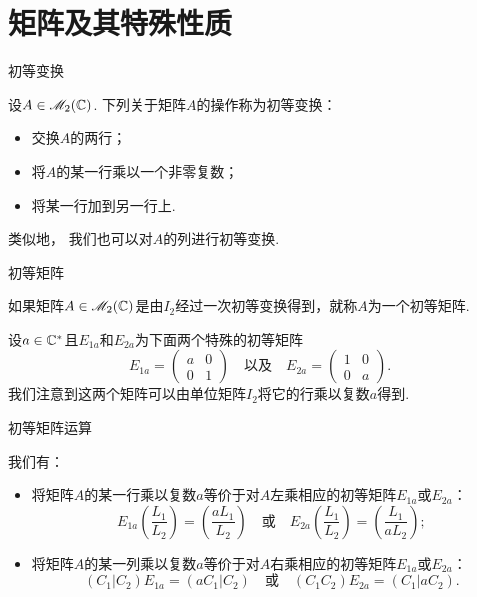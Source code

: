\section{矩阵及其特殊性质}
  \begin{definition}
    {\kaishu 初等变换}

    设$A\in\mathscr M_2(\mathbb C)$. 下列关于矩阵$A$的操作称为{\kaishu 初等变换}：
    \begin{itemize}
      \item 交换$A$的两行；
      \item 将$A$的某一行乘以一个非零复数；
      \item 将某一行加到另一行上.
    \end{itemize}

    类似地， 我们也可以对$A$的列进行初等变换.
  \end{definition}

  \begin{definition}
    {\kaishu 初等矩阵} 

    如果矩阵$A\in\mathscr M_2(\mathbb C)$是由$I_2$经过一次初等变换得到，就称$A$为一个{\kaishu 初等矩阵}.
  \end{definition}

  设$a\in\mathbb C^\ast$且$E_{1a}$和$E_{2a}$为下面两个特殊的初等矩阵
  \[
    E_{1a} = \begin{pmatrix}
      a & 0 \\
      0 & 1
    \end{pmatrix}\quad \text{以及}\quad
    E_{2a} = \begin{pmatrix}
      1 & 0 \\
      0 & a
    \end{pmatrix}.
  \]
  我们注意到这两个矩阵可以由单位矩阵$I_2$将它的行乘以复数$a$得到.

  {\kaishu 初等矩阵运算}

  我们有：
  \begin{mybox}
    \begin{itemize}
      \item 将矩阵$A$的某一行乘以复数$a$等价于对$A${\kaishu 左}乘相应的初等矩阵$E_{1a}$或$E_{2a}$：
          \[
            E_{1a} \left( \frac{ L_1}{L_2} \right) =
            \left( \frac{a L_1}{L_2} \right)\quad
            \text{或}\quad
            E_{2a} \left( \frac{ L_1}{L_2} \right) =
            \left( \frac{L_1}{aL_2} \right);
          \]
      \item 将矩阵$A$的某一列乘以复数$a$等价于对$A${\kaishu 右}乘相应的初等矩阵$E_{1a}$或$E_{2a}$：
          \[
            (C_1|C_2)E_{1a} = (aC_1|C_2)\quad
            \text{或}\quad
            (C_1C_2)E_{2a} = (C_1|aC_2).
          \]
    \end{itemize}
  \end{mybox}

